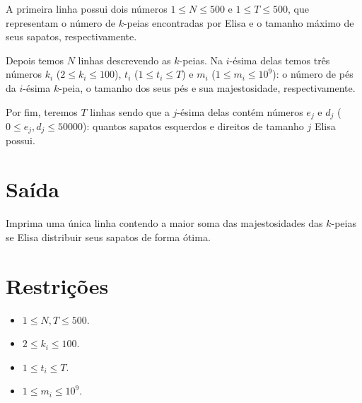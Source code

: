 A primeira linha possui dois números $1 \leq N \leq 500$ e $1 \leq T \leq 500$, que representam o número de $k$-peias encontradas por Elisa e o tamanho máximo de seus sapatos, respectivamente.

Depois temos $N$ linhas descrevendo as $k$-peias. Na $i$-ésima delas temos três números $k_i$ ($2 \leq k_i \leq 100$), $t_i$ ($1 \leq t_i \leq T$) e $m_i$ ($1 \leq m_i \leq 10^9$): o número de pés da $i$-ésima $k$-peia, o tamanho dos seus pés e sua majestosidade, respectivamente. 

Por fim, teremos $T$ linhas sendo que a $j$-ésima delas contém números $e_j$ e $d_j$ ($0 \leq e_j, d_j \leq 50000$): quantos sapatos esquerdos e direitos de tamanho $j$ Elisa possui.

%
%


\section*{Saída}

Imprima uma única linha contendo a maior soma das majestosidades das $k$-peias se Elisa distribuir seus sapatos de forma ótima.

\section*{Restrições}

\begin{itemize}
\item $ 1 \leq N, T \leq 500$.
\item $2 \leq k_i \leq 100$.
\item $1 \leq t_i \leq T$.
\item $1 \leq m_i \leq 10^9$.
\end{itemize}


\exemplo
